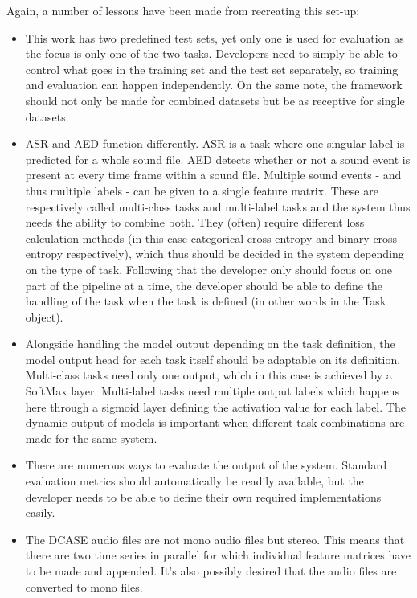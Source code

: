 Again, a number of lessons have been made from recreating this set-up:

\begin{itemize}
	\item This work has two predefined test sets, yet only one is used for evaluation as the focus is only one of the two tasks. Developers need to simply be able to control what goes in the training set and the test set separately, so training and evaluation can happen independently. On the same note, the framework should not only be made for combined datasets but be as receptive for single datasets.
	\item ASR and AED function differently. ASR is a task where one singular label is predicted for a whole sound file. AED detects whether or not a sound event is present at every time frame within a sound file. Multiple sound events - and thus multiple labels - can be given to a single feature matrix. These are respectively called multi-class tasks and multi-label tasks and the system thus needs the ability to combine both. They (often) require different loss calculation methods (in this case categorical cross entropy and binary cross entropy respectively), which thus should be decided in the system depending on the type of task. Following that the developer only should focus on one part of the pipeline at a time, the developer should be able to define the handling of the task when the task is defined (in other words in the Task object).
	\item Alongside handling the model output depending on the task definition, the model output head for each task itself should be adaptable on its definition. Multi-class tasks need only one output, which in this case is achieved by a SoftMax layer. Multi-label  tasks need multiple output labels which happens here through a sigmoid layer defining the activation value for each label. The dynamic output of models is important when different task combinations are made for the same system.
	\item There are numerous ways to evaluate the output of the system. Standard evaluation metrics should automatically be readily available, but the developer needs to be able to define their own required implementations easily. 
	\item The DCASE audio files are not mono audio files but stereo. This means that there are two time series in parallel for which individual feature matrices have to be made and appended. It's also possibly desired that the audio files are converted to mono files.
\end{itemize}

